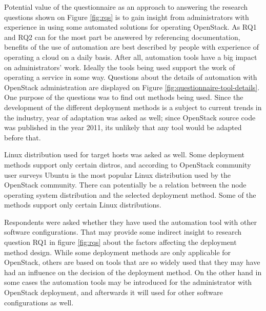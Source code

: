 Potential value of the questionnaire as an approach to answering the research
questions shown on Figure \ref{fig:rqs} is to gain insight from administrators
with experience in using some automated solutions for operating OpenStack. As
RQ1 and RQ2 can for the most part be answered by referencing documentation,
benefits of the use of automation are best described by people with experience
of operating a cloud on a daily basis. After all, automation tools have a big
impact on administrators' work. Ideally the tools being used support the work
of operating a service in some way. Questions about the details of automation
with OpenStack administration are displayed on Figure
\ref{fig:questionnaire-tool-details}. One purpose of the questions was to find
out methods being used. Since the development of the different deployment
methods is a subject to current trends in the industry, year of adaptation was
asked as well; since OpenStack source code was published in the year 2011, its
unlikely that any tool would be adapted before that.

Linux distribution used for target hosts was asked as well. Some deployment
methods support only certain distros, and according to OpenStack community user
surveys \cite{openstack-user-survey-2018} Ubuntu is the most popular Linux
distribution used by the OpenStack community. There can potentially be a
relation between the node operating system distribution and the selected
deployment method. Some of the methods support only certain Linux
distributions.

Respondents were asked whether they have used the automation tool with other
software configurations. That may provide some indirect insight to research
question RQ1 in figure \ref{fig:rqs} about the factors affecting the deployment
method design. While some deployment methods are only applicable for OpenStack,
others are based on tools that are so widely used that they may have had an
influence on the decision of the deployment method. On the other hand in some
cases the automation tools may be introduced for the administrator with
OpenStack deployment, and afterwards it will used for other software
configurations as well.

